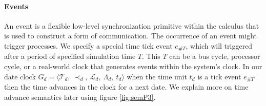 \paragraph{Events}
An event is a flexible low-level synchronization primitive within the calculus that is used to construct a form of communication. The occurrence of an event might trigger processes. We specify a special time tick event $ e_{\#T}$, which will triggered after a period of specified simulation time $ T$. This $ T$ can be a bus cycle, processor cycle, or a real-world clock that generates events within the system's clock. In our date clock $ G_{d} =  \langle \mathcal{T}_{{d}},\  \prec_{{d}}, \ \mathcal{L}_{{d}}, \ \Lambda_{{d}},\  t_{{d}}  \rangle $ when the time unit $ t_d $ is a tick event $ e_{\#T}$ then the time advances in the clock for a next date. We explain more on time advance semantics later using figure \ref{fig:semP3}.
